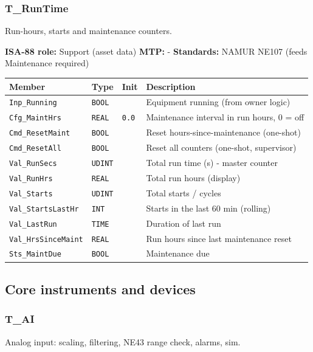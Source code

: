 \subsubsection*{T\_RunTime}
\label{app:pclib:truntime}
Run-hours, starts and maintenance counters.

{\small\textbf{ISA-88 role:} Support (asset data) \quad \textbf{MTP:} - \quad \textbf{Standards:} NAMUR NE107 (feeds Maintenance required)}
{\footnotesize
\begin{longtable}{@{}>{\raggedright\arraybackslash}p{3.4cm}>{\raggedright\arraybackslash}p{3.3cm}>{\raggedright\arraybackslash}p{1.3cm}>{\raggedright\arraybackslash}p{6.4cm}@{}}
\toprule
\rowcolor{tblhead}\textbf{Member} & \textbf{Type} & \textbf{Init} & \textbf{Description} \\
\midrule
\endhead
\texttt{Inp\_Running} & \texttt{BOOL} &  & Equipment running (from owner logic) \\
\texttt{Cfg\_MaintHrs} & \texttt{REAL} & \texttt{0.0} & Maintenance interval in run hours, 0 = off \\
\texttt{Cmd\_ResetMaint} & \texttt{BOOL} &  & Reset hours-since-maintenance (one-shot) \\
\texttt{Cmd\_ResetAll} & \texttt{BOOL} &  & Reset all counters (one-shot, supervisor) \\
\texttt{Val\_RunSecs} & \texttt{UDINT} &  & Total run time (s) - master counter \\
\texttt{Val\_RunHrs} & \texttt{REAL} &  & Total run hours (display) \\
\texttt{Val\_Starts} & \texttt{UDINT} &  & Total starts /\allowbreak{} cycles \\
\texttt{Val\_StartsLastHr} & \texttt{INT} &  & Starts in the last 60 min (rolling) \\
\texttt{Val\_LastRun} & \texttt{TIME} &  & Duration of last run \\
\texttt{Val\_HrsSinceMaint} & \texttt{REAL} &  & Run hours since last maintenance reset \\
\texttt{Sts\_MaintDue} & \texttt{BOOL} &  & Maintenance due \\
\bottomrule
\end{longtable}
}
\subsection{Core instruments and devices}
\subsubsection*{T\_AI}
\label{app:pclib:tai}
Analog input: scaling, filtering, NE43 range check, alarms, sim.

